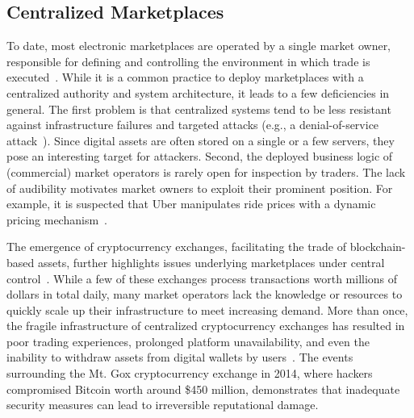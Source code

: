 \subsection{Centralized Marketplaces}
To date, most electronic marketplaces are operated by a single market owner, responsible for defining and controlling the environment in which trade is executed~\cite{yarom2004decentralized}.
While it is a common practice to deploy marketplaces with a centralized authority and system architecture, it leads to a few deficiencies in general.
The first problem is that centralized systems tend to be less resistant against infrastructure failures and targeted attacks (e.g., a denial-of-service attack~\cite{mirkovic2004internet}).
Since digital assets are often stored on a single or a few servers, they pose an interesting target for attackers.
Second, the deployed business logic of (commercial) market operators is rarely open for inspection by traders.
The lack of audibility motivates market owners to exploit their prominent position.
For example, it is suspected that Uber manipulates ride prices with a dynamic pricing mechanism~\cite{chen2015peeking}.

The emergence of cryptocurrency exchanges, facilitating the trade of blockchain-based assets, further highlights issues underlying marketplaces under central control~\cite{moore2013beware}.
While a few of these exchanges process transactions worth millions of dollars in total daily, many market operators lack the knowledge or resources to quickly scale up their infrastructure to meet increasing demand.
More than once, the fragile infrastructure of centralized cryptocurrency exchanges has resulted in poor trading experiences, prolonged platform unavailability, and even the inability to withdraw assets from digital wallets by users~\cite{centralizedexchanges}.
The events surrounding the Mt. Gox cryptocurrency exchange in 2014, where hackers compromised Bitcoin worth around \$450 million, demonstrates that inadequate security measures can lead to irreversible reputational damage.

